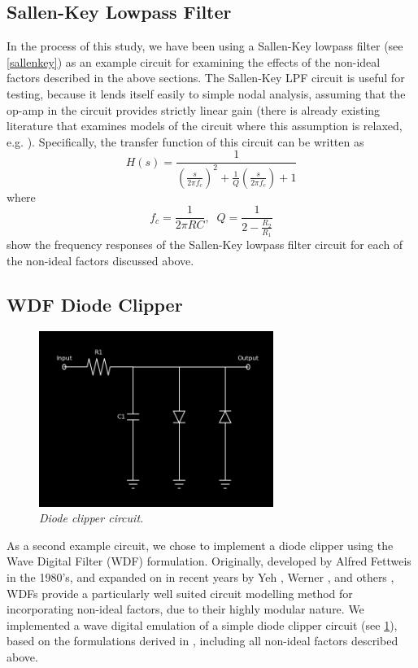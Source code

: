 \documentclass[twoside,a4paper]{article}
\begin{document}
\subsection{Sallen-Key Lowpass Filter} \label{sec:SK-LPF}
%
In the process of this study, we have been using a Sallen-Key lowpass
filter \cite{SallenKey} (see \cref{sallenkey}) as an example circuit for
examining the effects of the non-ideal factors described in the above
sections. The Sallen-Key LPF circuit is useful for testing, because it
lends itself easily to simple nodal analysis, assuming that the op-amp
in the circuit provides strictly linear gain (there is already existing
literature that examines models of the circuit where this assumption is
relaxed, e.g. \cite{SKF-DAFX}). Specifically, the transfer function of
this circuit can be written as
%
\begin{equation}
    H(s) = \frac{1}{\left(\frac{s}{2\pi f_c} \right)^2
         + \frac{1}{Q}\left(\frac{s}{2\pi f_c} \right) + 1}  
    \label{eq:SKF-transfer}
\end{equation}
%
where
%
\begin{equation}
    f_c = \frac{1}{2\pi RC}, \;\;
    Q = \frac{1}{2 - \frac{R_2}{R_1}}
    \label{eq:SKF-params}
\end{equation}
%
 show the
frequency responses of the Sallen-Key lowpass filter circuit for
each of the non-ideal factors discussed above.

\subsection{WDF Diode Clipper} \label{sec:WDF}
%
\begin{figure}[h]
    \center
    \includegraphics[width=3in]{Pics/diodeclipper.png}
    \caption{\label{diodeclipper}{\it Diode clipper circuit.}}
\end{figure}
%
As a second example circuit, we chose to implement a diode clipper using
the Wave Digital Filter (WDF) formulation. Originally, developed by
Alfred Fettweis \cite{Fettweis} in the 1980's, and expanded on in recent
years by Yeh \cite{YehWDF}, Werner \cite{KurtThesis}, and others
\cite{JJWDF,WDF2}, WDFs provide a particularly well suited circuit
modelling method for incorporating non-ideal factors, due to their highly
modular nature. We implemented a wave digital emulation of a simple diode
clipper circuit (see \cref{diodeclipper}), based on the formulations
derived in \cite{YehDiode,KurtDiode}, including all non-ideal factors
described above.
\end{document}
